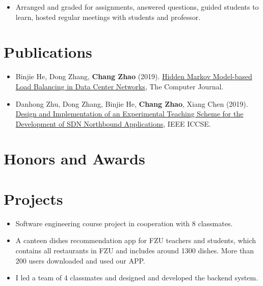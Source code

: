 \documentclass{resume}
\begin{document}
\begin{itemize}
  \item Arranged and graded for assignments, answered questions, guided students to learn, hosted regular meetings with students and professor.
\end{itemize}


\section{Publications}
\begin{itemize}
  \item Binjie He, Dong Zhang, \textbf{Chang Zhao} (2019). \href{https://academic.oup.com/comjnl/advance-article-abstract/doi/10.1093/comjnl/bxz142/5666159}{Hidden Markov Model-based Load Balancing in Data Center Networks}, The
  Computer Journal.
  \item Danhong Zhu, Dong Zhang, Binjie He, \textbf{Chang Zhao}, Xiang Chen (2019). \href{https://ieeexplore.ieee.org/document/8845443}{Design and Implementation of an Experimental Teaching Scheme for the Development of SDN Northbound Applications}, IEEE ICCSE.
\end{itemize}

\section{Honors and Awards}

\section{Projects}
\begin{itemize}
  \item Software engineering course project in cooperation with 8 classmates.
  \item A canteen dishes recommendation app for FZU teachers and students, which contains all restaurants in FZU and includes around 1300 dishes. More than 200 users downloaded and used our APP.
  \item I led a team of 4 classmates and designed and developed the backend system.
\end{itemize}
\end{document}
